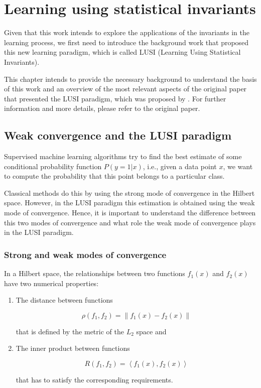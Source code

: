 
\newcommand{\Tau}{\mathcal{T}}
\newcommand{\norm}[1]{\lVert #1 \rVert}
\newcommand{\innerprod}[1]{\left< #1 \right>}
\newcommand{\set}[1]{\lbrace #1 \rbrace}

\chapter{Learning using statistical invariants} %
\label{Chapter2}

Given that this work intends to explore the applications of the invariants in the learning
process, we first need to introduce the background work that proposed this new learning
paradigm, which is called LUSI (Learning Using Statistical Invariants).

This chapter intends to provide the necessary background to understand the basis of this work
and an overview of the most relevant aspects of the original paper that presented the LUSI paradigm,
which was proposed by \cite{Vapnik2019}. For further information and more details, please
refer to the original paper.

\section{Weak convergence and the LUSI paradigm}

Supervised machine learning algorithms try to find the best estimate of some conditional probability
function $P(y = 1 | x)$, i.e., given a data point $x$, we want to compute the probability that this
point belongs to a particular class.

Classical methods do this by using the strong mode of convergence in the Hilbert space. However,
in the LUSI paradigm this estimation is obtained using the weak mode of convergence. Hence, it is
important to understand the difference between this two modes of convergence and what role
the weak mode of convergence plays in the LUSI paradigm.

\subsection{Strong and weak modes of convergence}

In a Hilbert space, the relationships between two functions $f_1(x)$ and $f_2(x)$ have two
numerical properties:

\begin{enumerate}
    \item The distance between functions
    
    \[
        \rho (f_1, f_2) = \norm{f_1(x) - f_2(x)}
    \]
    
    that is defined by the metric of the $L_2$ space and
    
    \item The inner product between functions
    
    \[
        R(f_1, f_2) = \innerprod{f_1(x), f_2(x)}
    \]
    
    that has to satisfy the corresponding requirements.
\end{enumerate}

